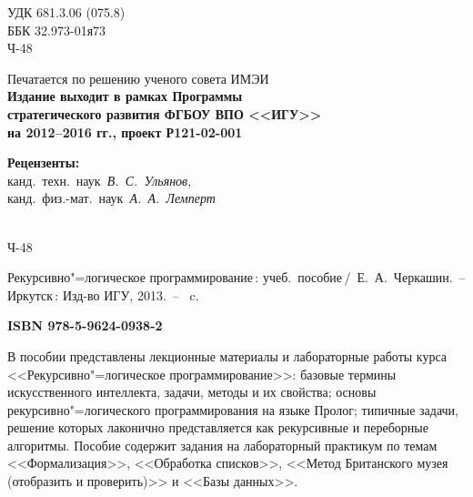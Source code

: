\documentclass[14pt, openany, twoside, final]{extbook} %
\begin{document}
\newpage
\begin{mygroup}
\thispagestyle{empty}
\noindent УДК 681.3.06 (075.8)\\ %

\noindent ББК 32.973-01я73\\ %

\noindent\mbox{}\hspace{2em}Ч-48 %

\begin{center}\small
Печатается по решению ученого совета ИМЭИ\\[2ex]
\bfseries Издание выходит в рамках Программы\\
стратегического развития ФГБОУ ВПО <<ИГУ>>\\
на 2012--2016 гг., проект Р121-02-001
\end{center}
\vspace{1ex}
\begin{center}\small
\textbf{Рецензенты:} \\
канд.~техн.~наук~{\em В.~С.~Ульянов},\\ канд.~физ.-мат.~наук~{\em А.~А.~Лемперт}
\end{center}
\vfill
\noindent\begin{minipage}[t]{2em}
\noindent\mbox{}\\
Ч-48
\end{minipage}%
\begin{minipage}[t]{0.95\linewidth}
\setlength{\parindent}{5ex}

Рекурсивно"=логическое программирование\,{}: учеб.~пособие\,/~Е.~А.~Черкашин.~--
Иркутск\,: Изд-во ИГУ, 2013.~-- \pageref{lastpage}~c.

{\bfseries ISBN 978-5-9624-0938-2}
\vspace{2ex}

\begingroup\small\parskip0pt
\vspace{1ex}
В пособии представлены лекционные материалы и лабораторные работы курса <<Рекурсивно"=логическое программирование>>: базовые термины искусственного интеллекта, задачи, методы и их свойства; основы рекурсивно"=логического программирования на языке Пролог; типичные задачи, решение которых лаконично представляется как рекурсивные и переборные алгоритмы. Пособие содержит задания на лабораторный практикум по темам <<Формализация>>, <<Обработка списков>>, <<Метод Британского музея (отобразить и проверить)>> и <<Базы данных>>.


\end{minipage}
\end{mygroup}
\end{document}
